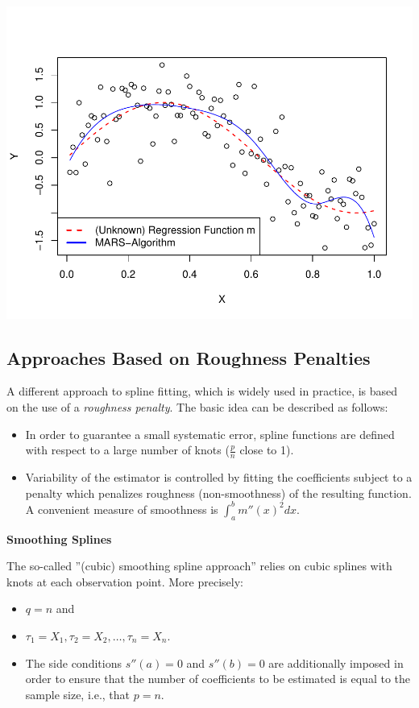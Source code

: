 \documentclass[14pt]{extreport}\usepackage[]{graphicx}\usepackage[]{xcolor}
\makeatletter
\def\maxwidth{ %
  \ifdim\Gin@nat@width>\linewidth
    \linewidth
  \else
    \Gin@nat@width
  \fi
}
\newenvironment{knitrout}{}{} %
\makeatother
\begin{document}
\begin{knitrout}
{\centering \includegraphics[width=\maxwidth]{figure/unnamed-chunk-14-1} 

}


\end{knitrout}

\newpage

\subsection{Approaches Based on Roughness Penalties}

A different approach to spline fitting, which is widely used in practice, is based on the use of
a \emph{roughness penalty}. The basic idea can be described as follows:
\begin{itemize}
\item In order to guarantee a small systematic error, spline functions are defined with respect to
 a large number of knots ($\frac{p}{n}$ close to 1).
\item Variability of the estimator is controlled by fitting the coefficients subject to a
 penalty which penalizes roughness (non-smoothness) of the resulting function. A convenient measure
 of smoothness is $\int_a^b m''(x)^2dx$.
\end{itemize}


\bigskip
\bigskip

\textbf{Smoothing Splines}

\bigskip

The so-called  ''(cubic) smoothing spline approach'' relies on cubic splines with knots at each observation
point. More precisely:
\begin{itemize}
\item $q=n$ and 
\item $\tau_1=X_1,\tau_2=X_2,\dots,\tau_n=X_n$. 
\item The side conditions $s''(a)=0$ and $s''(b)=0$
are additionally imposed in order to ensure that the number of coefficients to be estimated is equal to the sample size, i.e., that $p=n$.
\end{itemize}
\end{document}
